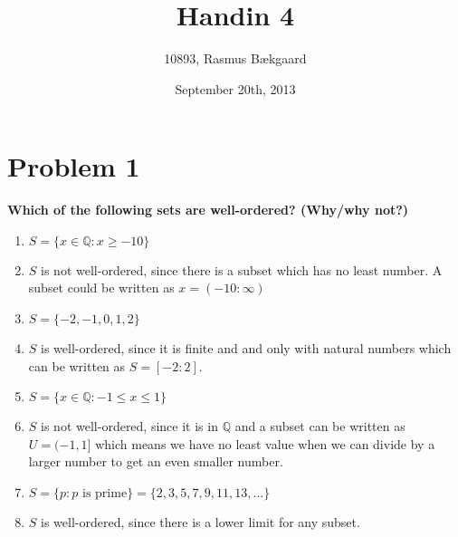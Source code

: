 \documentclass[english,11pt,a4paper]{article}
\title{Handin 4}
\author{10893, Rasmus Bækgaard}
\date{September 20th, 2013}
\begin{document}
\maketitle

\section*{Problem 1}
\textbf{Which of the  following sets are well-ordered? (Why/why not?)}
\begin{enumerate}[a]
\item $S=\{x \in \mathbb{Q}: x\geq -10\}$
\item[] $S$ is not well-ordered, since there is a subset which has no least number. A subset could be written as  $x=(-10:\infty)$ 

\item $S=\{-2 ,-1, 0, 1, 2\}$
\item[] $S$ is well-ordered, since it is finite and and only with natural numbers which can be written as $S=[-2:2]$.


\item $S=\{x \in \mathbb{Q}: -1\leq x \leq 1\}$
\item[] $S$ is not well-ordered, since it is in $\mathbb{Q}$ and a subset can be written as $U=(-1,1]$ which means we have no least value when we can divide by a larger number to get an even smaller number.


\item $S=\{p :p \text{ is prime}\} = \{2, 3,5,7,9,11,13,\dots\}$
\item[] $S$ is well-ordered, since there is a lower limit for any subset.
\end{enumerate}
\end{document}
